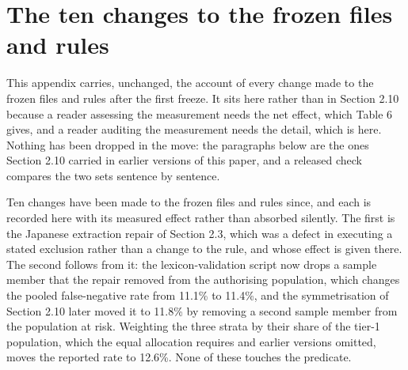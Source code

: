 \section{The ten changes to the frozen files and rules}\label{app:changes}

This appendix carries, unchanged, the account of every change made to the frozen files and rules after the first freeze. It sits here rather than in Section 2.10 because a reader assessing the measurement needs the net effect, which Table 6 gives, and a reader auditing the measurement needs the detail, which is here. Nothing has been dropped in the move: the paragraphs below are the ones Section 2.10 carried in earlier versions of this paper, and a released check compares the two sets sentence by sentence.

Ten changes have been made to the frozen files and rules since, and each is recorded here with its measured effect rather than absorbed silently. The first is the Japanese extraction repair of Section 2.3, which was a defect in executing a stated exclusion rather than a change to the rule, and whose effect is given there. The second follows from it: the lexicon-validation script now drops a sample member that the repair removed from the authorising population, which changes the pooled false-negative rate from 11.1\% to 11.4\%, and the symmetrisation of Section 2.10 later moved it to 11.8\% by removing a second sample member from the population at risk. Weighting the three strata by their share of the tier-1 population, which the equal allocation requires and earlier versions omitted, moves the reported rate to 12.6\%. None of these touches the predicate.

